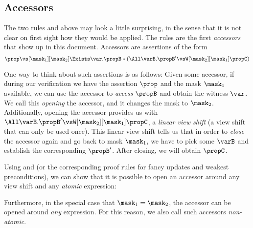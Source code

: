\subsection{Accessors}

The two rules  and  above may look a little surprising, in the sense that it is not clear on first sight how they would be applied.
The rules are the first \emph{accessors} that show up in this document.
Accessors are assertions of the form
\[ \prop \vs[\mask_1][\mask_2] \Exists\var. \propB * (\All\varB. \propB' \vsW[\mask_2][\mask_1] \propC) \]

One way to think about such assertions is as follows:
Given some accessor, if during our verification we have the assertion $\prop$ and the mask $\mask_1$ available, we can use the accessor to \emph{access} $\propB$ and obtain the witness $\var$.
We call this \emph{opening} the accessor, and it changes the mask to $\mask_2$.
Additionally, opening the accessor provides us with $\All\varB. \propB' \vsW[\mask_2][\mask_1] \propC$, a \emph{linear view shift} (\ie a view shift that can only be used once).
This linear view shift tells us that in order to \emph{close} the accessor again and go back to mask $\mask_1$, we have to pick some $\varB$ and establish the corresponding $\propB'$.
After closing, we will obtain $\propC$.

Using  and  (or the corresponding proof rules for fancy updates and weakest preconditions), we can show that it is possible to open an accessor around any view shift and any \emph{atomic} expression:

Furthermore, in the special case that $\mask_1 = \mask_2$, the accessor can be opened around \emph{any} expression.
For this reason, we also call such accessors \emph{non-atomic}.

